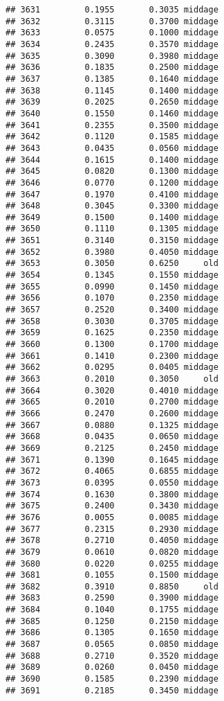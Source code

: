 \documentclass[
]{article}
\begin{document}
\begin{verbatim}
## 3631         0.1955       0.3035 middage
## 3632         0.3115       0.3700 middage
## 3633         0.0575       0.1000 middage
## 3634         0.2435       0.3570 middage
## 3635         0.3090       0.3980 middage
## 3636         0.1835       0.2500 middage
## 3637         0.1385       0.1640 middage
## 3638         0.1145       0.1400 middage
## 3639         0.2025       0.2650 middage
## 3640         0.1550       0.1460 middage
## 3641         0.2355       0.3500 middage
## 3642         0.1120       0.1585 middage
## 3643         0.0435       0.0560 middage
## 3644         0.1615       0.1400 middage
## 3645         0.0820       0.1300 middage
## 3646         0.0770       0.1200 middage
## 3647         0.1970       0.4100 middage
## 3648         0.3045       0.3300 middage
## 3649         0.1500       0.1400 middage
## 3650         0.1110       0.1305 middage
## 3651         0.3140       0.3150 middage
## 3652         0.3980       0.4050 middage
## 3653         0.3050       0.6250     old
## 3654         0.1345       0.1550 middage
## 3655         0.0990       0.1450 middage
## 3656         0.1070       0.2350 middage
## 3657         0.2520       0.3400 middage
## 3658         0.3030       0.3705 middage
## 3659         0.1625       0.2350 middage
## 3660         0.1300       0.1700 middage
## 3661         0.1410       0.2300 middage
## 3662         0.0295       0.0405 middage
## 3663         0.2010       0.3050     old
## 3664         0.3020       0.4010 middage
## 3665         0.2010       0.2700 middage
## 3666         0.2470       0.2600 middage
## 3667         0.0880       0.1325 middage
## 3668         0.0435       0.0650 middage
## 3669         0.2125       0.2450 middage
## 3671         0.1390       0.1645 middage
## 3672         0.4065       0.6855 middage
## 3673         0.0395       0.0550 middage
## 3674         0.1630       0.3800 middage
## 3675         0.2400       0.3430 middage
## 3676         0.0055       0.0085 middage
## 3677         0.2315       0.2930 middage
## 3678         0.2710       0.4050 middage
## 3679         0.0610       0.0820 middage
## 3680         0.0220       0.0255 middage
## 3681         0.1055       0.1500 middage
## 3682         0.3910       0.8850     old
## 3683         0.2590       0.3900 middage
## 3684         0.1040       0.1755 middage
## 3685         0.1250       0.2150 middage
## 3686         0.1305       0.1650 middage
## 3687         0.0565       0.0850 middage
## 3688         0.2710       0.3520 middage
## 3689         0.0260       0.0450 middage
## 3690         0.1585       0.2390 middage
## 3691         0.2185       0.3450 middage

\end{verbatim}
\end{document}
